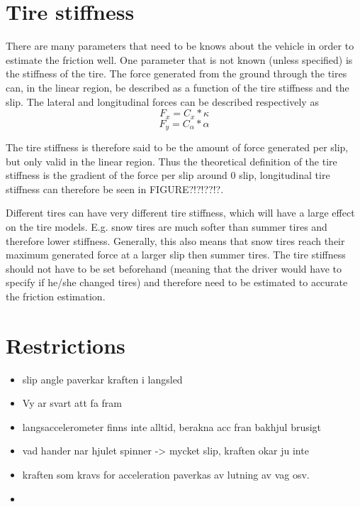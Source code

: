 \section{Tire stiffness}

There are many parameters that need to be knows about the vehicle in order to estimate the friction well. One parameter that is not known (unless specified) is the stiffness of the tire. The force generated from the ground through the tires can, in the linear region, be described as a function of the tire stiffness and the slip. The lateral and longitudinal forces can be described respectively as
\begin{equation}
	F_{x} = C_{x}*\kappa
\end{equation}
\begin{equation}
	F_{y} = C_{\alpha}*\alpha
\end{equation}

The tire stiffness is therefore said to be the amount of force generated per slip, but only valid in the linear region. Thus the theoretical definition of the tire stiffness is the gradient of the force per slip around 0 slip, longitudinal tire stiffness can therefore be seen in FIGURE?!?!??!?. 

Different tires can have very different tire stiffness, which will have a large effect on the tire models. E.g. snow tires are much softer than summer tires and therefore lower stiffness. Generally, this also means that snow tires reach their maximum generated force at a larger slip then summer tires. The tire stiffness should not have to be set beforehand (meaning that the driver would have to specify if he/she changed tires) and therefore need to be estimated to accurate the friction estimation.
\section{Restrictions}

\begin{itemize}
	\item slip angle paverkar kraften i langsled
	\item Vy ar svart att fa fram
	\item langsaccelerometer finns inte alltid, berakna acc fran bakhjul brusigt
	\item vad hander nar hjulet spinner -> mycket slip, kraften okar ju inte
	\item kraften som kravs for acceleration paverkas av lutning av vag osv.
	\item 
\end{itemize}

